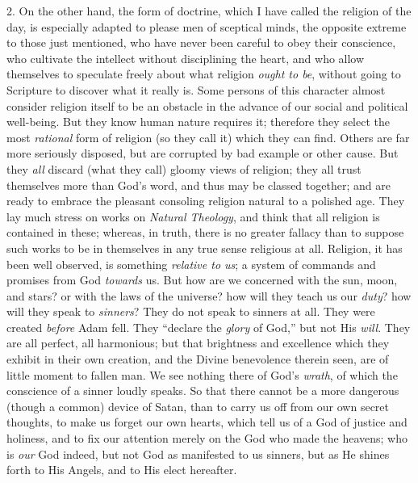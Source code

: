 2. On the other hand, the form of doctrine, which I
have called the religion of the day, is especially
adapted to please men of sceptical minds, the opposite
extreme to those just mentioned, who have never been
careful to obey their conscience, who cultivate the
intellect without disciplining the heart, and who allow
themselves to speculate freely about what religion \emph{ought
to be}, without going to Scripture to discover what it
really is. Some persons of this character almost consider
religion itself to be an obstacle in the advance of our
social and political well-being. But they know human
nature requires it; therefore they select the most \emph{rational}
form of religion (so they call it) which they can find.
Others are far more seriously disposed, but are corrupted
by bad example or other cause. But they \emph{all}
discard (what they call) gloomy views of religion; they
all trust themselves more than God's word, and thus may
be classed together; and are ready to embrace the
pleasant consoling religion natural to a polished age.
They lay much stress on works on \emph{Natural Theology},
and think that all religion is contained in these;
whereas, in truth, there is no greater fallacy than to
suppose such works to be in themselves in any true sense
religious at all. Religion, it has been well observed, is
something \emph{relative to us}; a system of commands and
promises from God \emph{towards} us. But how are we
concerned with the sun, moon, and stars? or with the laws
of the universe? how will they teach us our \emph{duty}?
how will they speak to \emph{sinners}? They do not speak
to sinners at all. They were created \emph{before} Adam
fell. They ``declare the \emph{glory} of God,''
but not His \emph{will}. They are all perfect, all
harmonious; but that brightness and excellence which they
exhibit in their own creation, and the Divine benevolence
therein seen, are of little moment to fallen man. We see
nothing there of God's \emph{wrath}, of which the
conscience of a sinner loudly speaks. So that there
cannot be a more dangerous (though a common) device of
Satan, than to carry us off from our own secret thoughts,
to make us forget our own hearts, which tell us of a God
of justice and holiness, and to fix our attention merely
on the God who made the heavens; who is \emph{our} God
indeed, but not God as manifested to us sinners, but as
He shines forth to His Angels, and to His elect
hereafter.

